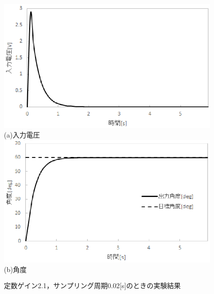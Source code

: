 \documentclass[11pt,a4paper]{jsarticle}
\begin{document}
\begin{figure}[H]
 \begin{center}
  \includegraphics[scale=.6]{./picture/regraph7.eps} \\
  (a)入力電圧 \\
  \includegraphics[scale=.6]{./picture/regraph8.eps} \\
  (b)角度
  \caption{定数ゲイン2.1，サンプリング周期0.02[s]のときの実験結果}
 \end{center}
\end{figure}
\end{document}

